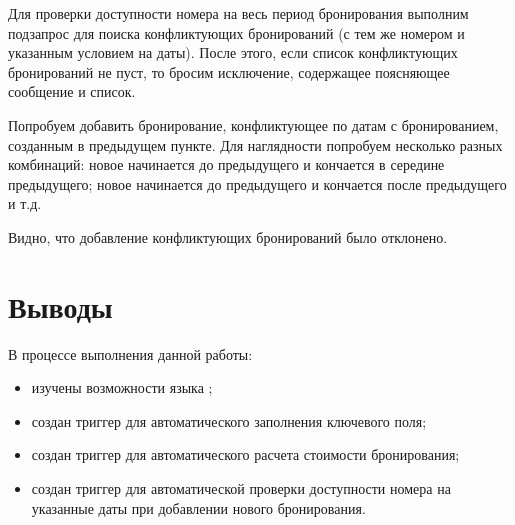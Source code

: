 Для проверки доступности номера на весь период бронирования выполним подзапрос для поиска конфликтующих бронирований (с тем же номером и указанным условием на даты). После этого, если список конфликтующих бронирований не пуст, то бросим исключение, содержащее поясняющее сообщение и список.



Попробуем добавить бронирование, конфликтующее по датам с бронированием, созданным в предыдущем пункте. Для наглядности попробуем несколько разных комбинаций: новое начинается до предыдущего и кончается в середине предыдущего; новое начинается до предыдущего и кончается после предыдущего и т.д.



Видно, что добавление конфликтующих бронирований было отклонено.

\vspace{-1em}
\section{Выводы}

В процессе выполнения данной работы:

\begin{itemize}
	\item изучены возможности языка  ;
	\item создан триггер для автоматического заполнения ключевого поля;
	\item создан триггер для автоматического расчета стоимости бронирования;
	\item создан триггер для автоматической проверки доступности номера на указанные даты при добавлении нового бронирования.
\end{itemize}


